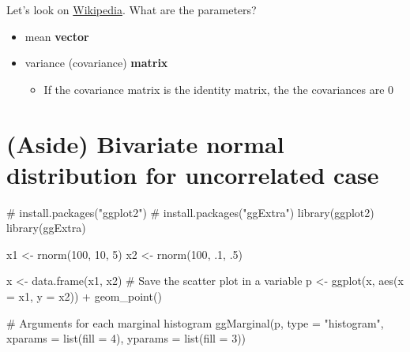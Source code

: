 \documentclass[
  letterpaper,
  DIV=11,
  numbers=noendperiod]{scrreprt}
\newenvironment{Shaded}{\begin{snugshade}}{\end{snugshade}}
\newcommand{\AttributeTok}[1]{\textcolor[rgb]{0.40,0.45,0.13}{#1}}
\newcommand{\CommentTok}[1]{\textcolor[rgb]{0.37,0.37,0.37}{#1}}
\newcommand{\DecValTok}[1]{\textcolor[rgb]{0.68,0.00,0.00}{#1}}
\newcommand{\FunctionTok}[1]{\textcolor[rgb]{0.28,0.35,0.67}{#1}}
\newcommand{\NormalTok}[1]{\textcolor[rgb]{0.00,0.23,0.31}{#1}}
\newcommand{\OtherTok}[1]{\textcolor[rgb]{0.00,0.23,0.31}{#1}}
\newcommand{\SpecialCharTok}[1]{\textcolor[rgb]{0.37,0.37,0.37}{#1}}
\newcommand{\StringTok}[1]{\textcolor[rgb]{0.13,0.47,0.30}{#1}}
\providecommand{\tightlist}{%
  \setlength{\itemsep}{0pt}\setlength{\parskip}{0pt}}\usepackage{longtable,booktabs,array}
\begin{document}
Let's look on
\href{https://en.wikipedia.org/wiki/Multivariate_normal_distribution}{Wikipedia}.
What are the parameters?

\begin{itemize}
\item
  mean \textbf{vector}
\item
  variance (covariance) \textbf{matrix}

  \begin{itemize}
  \tightlist
  \item
    If the covariance matrix is the identity matrix, the the covariances
    are 0
  \end{itemize}
\end{itemize}

\section{\texorpdfstring{{(Aside) Bivariate normal distribution for
uncorrelated
case}}{(Aside) Bivariate normal distribution for uncorrelated case}}\label{aside-bivariate-normal-distribution-for-uncorrelated-case}

\begin{Shaded}
\begin{Highlighting}[]
\CommentTok{\# install.packages("ggplot2")}
\CommentTok{\# install.packages("ggExtra")}
\FunctionTok{library}\NormalTok{(ggplot2)}
\FunctionTok{library}\NormalTok{(ggExtra)}

\NormalTok{x1 }\OtherTok{\textless{}{-}} \FunctionTok{rnorm}\NormalTok{(}\DecValTok{100}\NormalTok{, }\DecValTok{10}\NormalTok{, }\DecValTok{5}\NormalTok{)}
\NormalTok{x2 }\OtherTok{\textless{}{-}} \FunctionTok{rnorm}\NormalTok{(}\DecValTok{100}\NormalTok{, .}\DecValTok{1}\NormalTok{, .}\DecValTok{5}\NormalTok{)}

\NormalTok{x }\OtherTok{\textless{}{-}} \FunctionTok{data.frame}\NormalTok{(x1, x2)}
\CommentTok{\# Save the scatter plot in a variable}
\NormalTok{p }\OtherTok{\textless{}{-}} \FunctionTok{ggplot}\NormalTok{(x, }\FunctionTok{aes}\NormalTok{(}\AttributeTok{x =}\NormalTok{ x1, }\AttributeTok{y =}\NormalTok{ x2)) }\SpecialCharTok{+}
  \FunctionTok{geom\_point}\NormalTok{()}

\CommentTok{\# Arguments for each marginal histogram}
\FunctionTok{ggMarginal}\NormalTok{(p, }\AttributeTok{type =} \StringTok{"histogram"}\NormalTok{, }
           \AttributeTok{xparams =} \FunctionTok{list}\NormalTok{(}\AttributeTok{fill =} \DecValTok{4}\NormalTok{),}
           \AttributeTok{yparams =} \FunctionTok{list}\NormalTok{(}\AttributeTok{fill =} \DecValTok{3}\NormalTok{))}
\end{Highlighting}
\end{Shaded}
\end{document}
